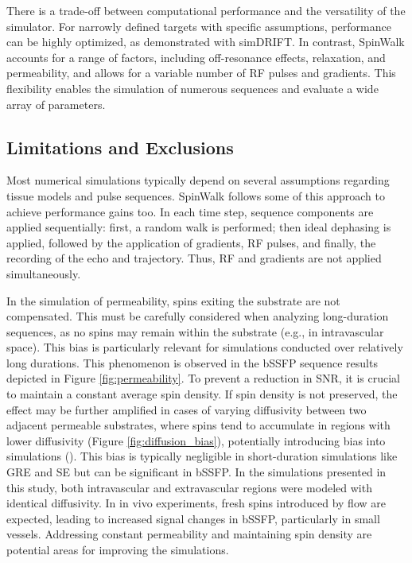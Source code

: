 There is a trade-off between computational performance and the versatility of the simulator. For narrowly defined targets with specific assumptions, performance can be highly optimized, as demonstrated with simDRIFT. In contrast, SpinWalk accounts for a range of factors, including off-resonance effects, relaxation, and permeability, and allows for a variable number of RF pulses and gradients. This flexibility enables the simulation of numerous sequences and evaluate a wide array of parameters.


\subsection{Limitations and Exclusions}

Most numerical simulations typically depend on several assumptions regarding tissue models and pulse sequences. SpinWalk follows some of this approach to achieve performance gains too. In each time step, sequence components are applied sequentially: first, a random walk is performed; then ideal dephasing is applied, followed by the application of gradients, RF pulses, and finally, the recording of the echo and trajectory. Thus, RF and gradients are not applied simultaneously.

In the simulation of permeability, spins exiting the substrate are not compensated. This must be carefully considered when analyzing long-duration sequences, as no spins may remain within the substrate (e.g., in intravascular space). This bias is particularly relevant for simulations conducted over relatively long durations. This phenomenon is observed in the bSSFP sequence results depicted in Figure \ref{fig:permeability}. To prevent a reduction in SNR, it is crucial to maintain a constant average spin density. If spin density is not preserved, the effect may be further amplified in cases of varying diffusivity between two adjacent permeable substrates, where spins tend to accumulate in regions with lower diffusivity (Figure \ref{fig:diffusion_bias}), potentially introducing bias into simulations (\cite{fieremans2018physical}). This bias is typically negligible in short-duration simulations like GRE and SE but can be significant in bSSFP. In the simulations presented in this study, both intravascular and extravascular regions were modeled with identical diffusivity. In in vivo experiments, fresh spins introduced by flow are expected, leading to increased signal changes in bSSFP, particularly in small vessels. Addressing constant permeability and maintaining spin density are potential areas for improving the simulations.

